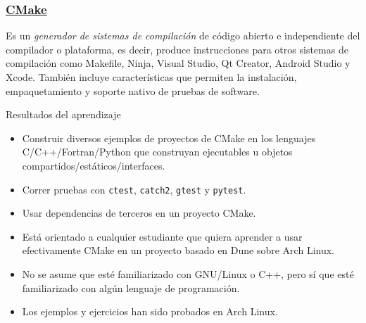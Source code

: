 




\begin{frame}[fragile]
	\frametitle{\href{https://cmake.org}{CMake}}
	Es un \emph{generador de sistemas de compilación} de código
	abierto e independiente del compilador o plataforma, es decir,
	produce instrucciones para otros sistemas de compilación como
	Makefile, Ninja, Visual Studio, Qt Creator, Android Studio y
	Xcode.
	También incluye características que permiten la instalación,
	empaquetamiento y soporte nativo de pruebas de software.

	\begin{block}{Resultados del aprendizaje}
		\begin{itemize}
			\item
			
			Construir diversos ejemplos de proyectos de CMake en los
			lenguajes C/C++/Fortran/Python que construyan ejecutables u
			objetos compartidos/estáticos/interfaces.
			
			\item
			
			Correr pruebas con \lstinline{ctest}, \lstinline{catch2},
			\lstinline{gtest} y \lstinline{pytest}.
			
			\item
			
			Usar dependencias de terceros en un proyecto CMake.
		\end{itemize}
	\end{block}

	\begin{block}{}
		\begin{itemize}
			\item


			Está orientado a cualquier estudiante que quiera aprender
			a usar efectivamente CMake en un proyecto basado en Dune
			sobre Arch Linux.
			
			\item

			No se asume que esté familiarizado con GNU/Linux o C++,
			pero sí que esté familiarizado con algún lenguaje de
			programación.
			
			\item

			Los ejemplos y ejercicios han sido probados en Arch
			Linux.
		\end{itemize}
	\end{block}
\end{frame}

